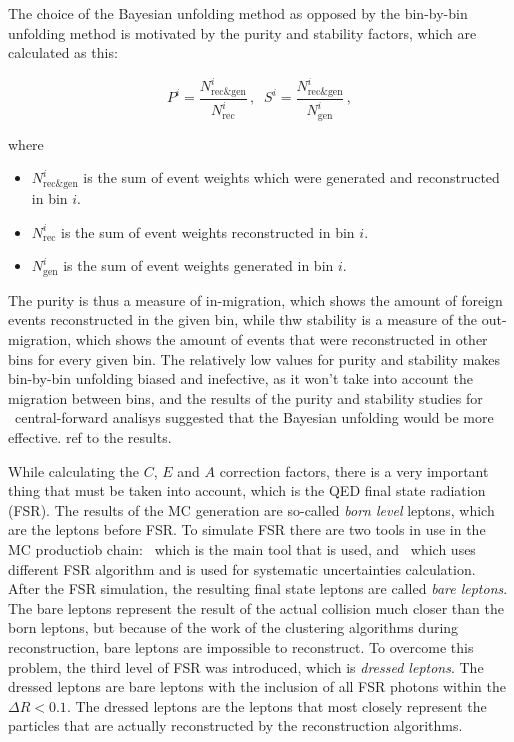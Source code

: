 The choice of the Bayesian unfolding method as opposed by the bin-by-bin unfolding method is motivated by the purity and stability factors, which are calculated as this:

\begin{equation}
P^{i} = \frac{N^{i}_{\text{rec\&gen}} }{ N^{i}_{\text{rec}} }\,, \; \;
S^{i} = \frac{N^{i}_{\text{rec\&gen}} }{ N^{i}_{\text{gen}} }\,,
\end{equation}

where
\begin{itemize}
\item {\bfseries $N^i_{\text{rec\&gen}}$} is the sum of event weights which were generated and reconstructed in bin $i$.
\item {\bfseries $N^i_{\text{rec}}$} is the sum of event weights reconstructed in bin $i$.
\item {\bfseries $N^i_{\text{gen}}$} is the sum of event weights generated in bin $i$.
\end{itemize}

The purity is thus a measure of in-migration, which shows the amount of foreign events reconstructed in the given bin, while thw stability is a measure of the out-migration, which shows the amount of events that were reconstructed in other bins for every given bin. The relatively low values for purity and stability makes bin-by-bin unfolding biased and inefective, as it won't take into account the migration between bins, and the results of the purity and stability studies for \Zee\ central-forward analisys suggested that the Bayesian unfolding would be more effective. \tbu ref to the results.

While calculating the $C$, $E$ and $A$ correction factors, there is a very important thing that must be taken into account, which is the QED final state radiation (FSR). The results of the MC generation are so-called {\itshape born level} leptons, which are the leptons before FSR. To simulate FSR there are two tools in use in the MC productiob chain: \Photos\, which is the main tool that is used, and \Sherpa\ which uses different FSR algorithm and is used for systematic uncertainties calculation. After the FSR simulation, the resulting final state leptons are called {\itshape bare leptons}. The bare leptons represent the result of the actual collision much closer than the born leptons, but because of the work of the clustering algorithms during reconstruction, bare leptons are impossible to reconstruct. To overcome this problem, the third level of FSR was introduced, which is {\itshape dressed leptons}. The dressed leptons are bare leptons with the inclusion of all FSR photons within the $\Delta R < 0.1$. The dressed leptons are the leptons that most closely represent the particles that are actually reconstructed by the reconstruction algorithms.

